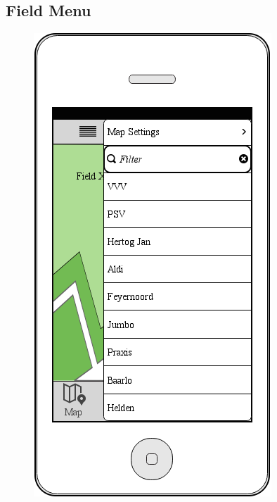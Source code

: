 \documentclass[12pt]{article}
\begin{document}
\subsection{Field Menu}
\begin{figure}[ht]
	\centering
	\includegraphics[width=\linewidth, height=0.4\textheight, keepaspectratio=true]{screenshots/Menu.png}

\end{figure}
\end{document}
